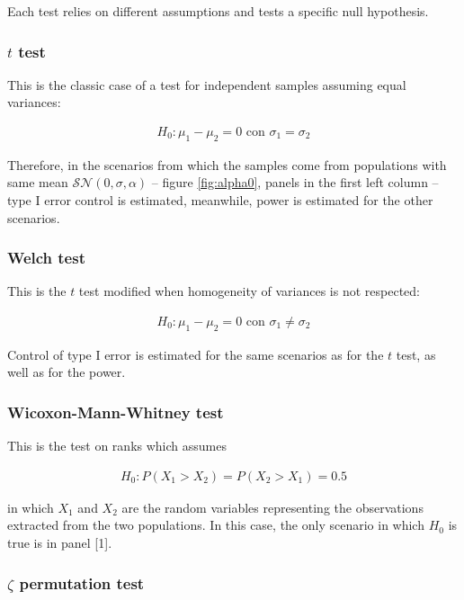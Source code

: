 \documentclass[10pt]{article}\usepackage[]{graphicx}\usepackage[]{xcolor}
\begin{document}
Each test relies on different assumptions and tests a specific null hypothesis. 

\subsubsection{$t$ test}


This is the classic case of a test for independent samples assuming equal variances:
 
\begin{eqnarray*}
H_0: \mu_1 - \mu_2 = 0 \mbox{ con } \sigma_1 = \sigma_2
\end{eqnarray*}

Therefore, in the scenarios from which the samples come from populations with same mean $\mathcal{SN}(0,\sigma,\alpha)$ -- figure \ref{fig:alpha0}, panels in the first left column -- type I error control is estimated, meanwhile, power is estimated for the other scenarios.

\subsubsection{Welch test}

This is the $t$ test modified when homogeneity of variances is not respected:

\begin{eqnarray*}
H_0: \mu_1 - \mu_2 = 0 \mbox{ con } \sigma_1 \neq \sigma_2
\end{eqnarray*}

Control of type I error is estimated for the same scenarios as for the $t$ test, as well as for the power.

\subsubsection{Wicoxon-Mann-Whitney test}

This is the test on ranks which assumes
 
\begin{eqnarray*}
H_0: P(X_1 > X_2) = P(X_2 > X_1) = 0.5
\end{eqnarray*} 

in which $X_1$ and $X_2$ are the random variables representing the observations extracted from the two populations. In this case, the only scenario in which $H_0$ is true is in panel [1].

\subsubsection{$\zeta$ permutation test}
\end{document}
